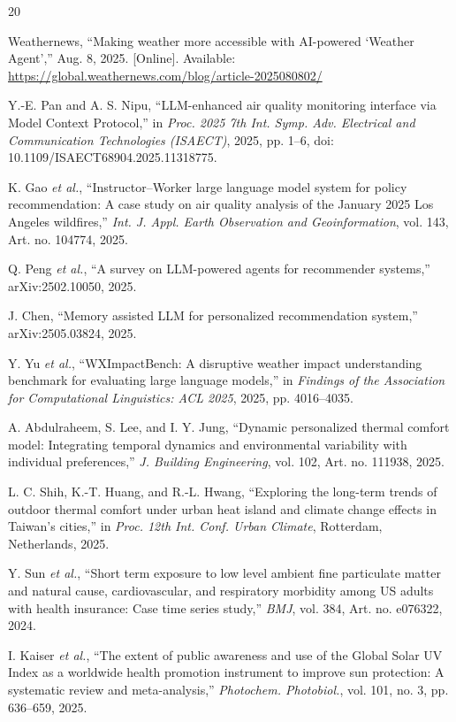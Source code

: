 \documentclass[conference]{IEEEtran}
\begin{document}
\begin{thebibliography}{20}

Weathernews, ``Making weather more accessible with AI-powered `Weather Agent','' Aug. 8, 2025. [Online]. Available: \url{https://global.weathernews.com/blog/article-2025080802/}

Y.-E. Pan and A. S. Nipu, ``LLM-enhanced air quality monitoring interface via Model Context Protocol,'' in \emph{Proc. 2025 7th Int. Symp. Adv. Electrical and Communication Technologies (ISAECT)}, 2025, pp. 1--6, doi: 10.1109/ISAECT68904.2025.11318775.

K. Gao \emph{et al.}, ``Instructor--Worker large language model system for policy recommendation: A case study on air quality analysis of the January 2025 Los Angeles wildfires,'' \emph{Int. J. Appl. Earth Observation and Geoinformation}, vol. 143, Art. no. 104774, 2025.

Q. Peng \emph{et al.}, ``A survey on LLM-powered agents for recommender systems,'' arXiv:2502.10050, 2025.

J. Chen, ``Memory assisted LLM for personalized recommendation system,'' arXiv:2505.03824, 2025.

Y. Yu \emph{et al.}, ``WXImpactBench: A disruptive weather impact understanding benchmark for evaluating large language models,'' in \emph{Findings of the Association for Computational Linguistics: ACL 2025}, 2025, pp. 4016--4035.

A. Abdulraheem, S. Lee, and I. Y. Jung, ``Dynamic personalized thermal comfort model: Integrating temporal dynamics and environmental variability with individual preferences,'' \emph{J. Building Engineering}, vol. 102, Art. no. 111938, 2025.

L. C. Shih, K.-T. Huang, and R.-L. Hwang, ``Exploring the long-term trends of outdoor thermal comfort under urban heat island and climate change effects in Taiwan's cities,'' in \emph{Proc. 12th Int. Conf. Urban Climate}, Rotterdam, Netherlands, 2025.

Y. Sun \emph{et al.}, ``Short term exposure to low level ambient fine particulate matter and natural cause, cardiovascular, and respiratory morbidity among US adults with health insurance: Case time series study,'' \emph{BMJ}, vol. 384, Art. no. e076322, 2024.

I. Kaiser \emph{et al.}, ``The extent of public awareness and use of the Global Solar UV Index as a worldwide health promotion instrument to improve sun protection: A systematic review and meta-analysis,'' \emph{Photochem. Photobiol.}, vol. 101, no. 3, pp. 636--659, 2025.


\end{thebibliography}
\end{document}
